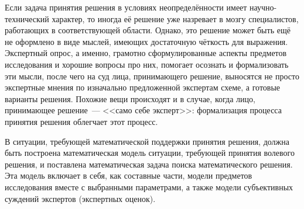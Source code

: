 \begin{notice}
Если задача принятия решения в условиях неопределённости имеет научно-технический характер, то иногда её решение уже назревает в мозгу специалистов, работающих в соответствующей области. Однако, это решение может быть ещё не оформлено в виде мыслей, имеющих достаточную чёткость для выражения. Экспертный опрос, а именно, грамотно сформулированные аспекты предметов исследования и хорошие вопросы про них, помогает осознать и формализовать эти мысли, после чего на суд лица, принимающего решение, выносятся не просто экспертные мнения по изначально предложенной экспертам схеме, а готовые варианты решения. Похожие вещи происходят и в случае, когда лицо, принимающее решение~--- <<само себе эксперт>>: формализация процесса принятия решения облегчает этот процесс. 
\end{notice}

В ситуации, требующей математической поддержки принятия решения, должна быть построена математическая модель ситуации, требующей принятия волевого решения, и поставлена математическая задача поиска математического решения. Эта модель включает в себя, как составные части, модели предметов исследования вместе с выбранными параметрами, а также модели субъективных суждений экспертов (экспертных оценок).
 

